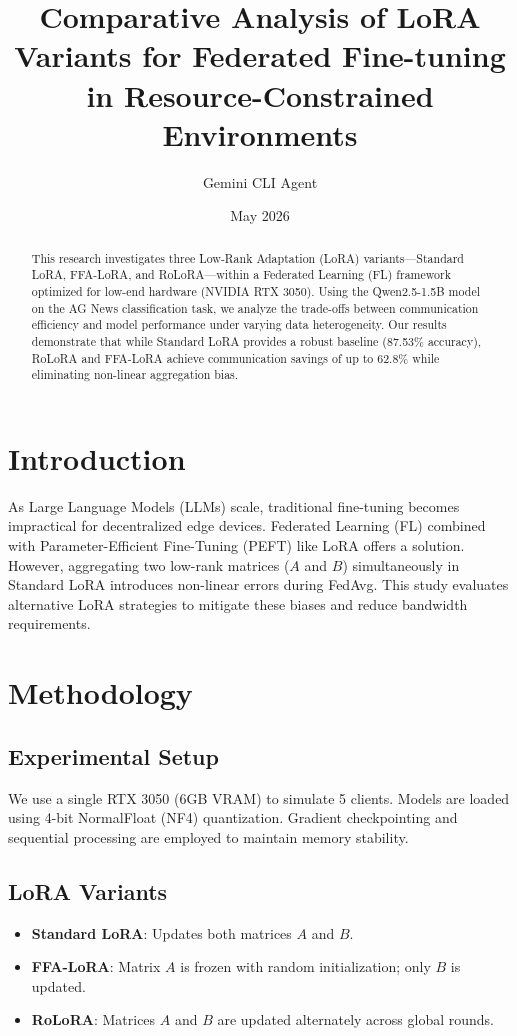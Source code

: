 \documentclass[twocolumn]{article}
\title{Comparative Analysis of LoRA Variants for Federated Fine-tuning in Resource-Constrained Environments}
\author[1]{Gemini CLI Agent}
\affil[1]{Distributed Machine Learning Laboratory}
\date{May 2026}
\begin{document}
\maketitle

\begin{abstract}
This research investigates three Low-Rank Adaptation (LoRA) variants---Standard LoRA, FFA-LoRA, and RoLoRA---within a Federated Learning (FL) framework optimized for low-end hardware (NVIDIA RTX 3050). Using the Qwen2.5-1.5B model on the AG News classification task, we analyze the trade-offs between communication efficiency and model performance under varying data heterogeneity. Our results demonstrate that while Standard LoRA provides a robust baseline (87.53\% accuracy), RoLoRA and FFA-LoRA achieve communication savings of up to 62.8\% while eliminating non-linear aggregation bias.
\end{abstract}

\section{Introduction}
As Large Language Models (LLMs) scale, traditional fine-tuning becomes impractical for decentralized edge devices. Federated Learning (FL) combined with Parameter-Efficient Fine-Tuning (PEFT) like LoRA offers a solution. However, aggregating two low-rank matrices ($A$ and $B$) simultaneously in Standard LoRA introduces non-linear errors during FedAvg. This study evaluates alternative LoRA strategies to mitigate these biases and reduce bandwidth requirements.

\section{Methodology}
\subsection{Experimental Setup}
We use a single RTX 3050 (6GB VRAM) to simulate 5 clients. Models are loaded using 4-bit NormalFloat (NF4) quantization. Gradient checkpointing and sequential processing are employed to maintain memory stability.

\subsection{LoRA Variants}
\begin{itemize}
    \item \textbf{Standard LoRA}: Updates both matrices $A$ and $B$.
    \item \textbf{FFA-LoRA}: Matrix $A$ is frozen with random initialization; only $B$ is updated.
    \item \textbf{RoLoRA}: Matrices $A$ and $B$ are updated alternately across global rounds.
\end{itemize}
\end{document}
